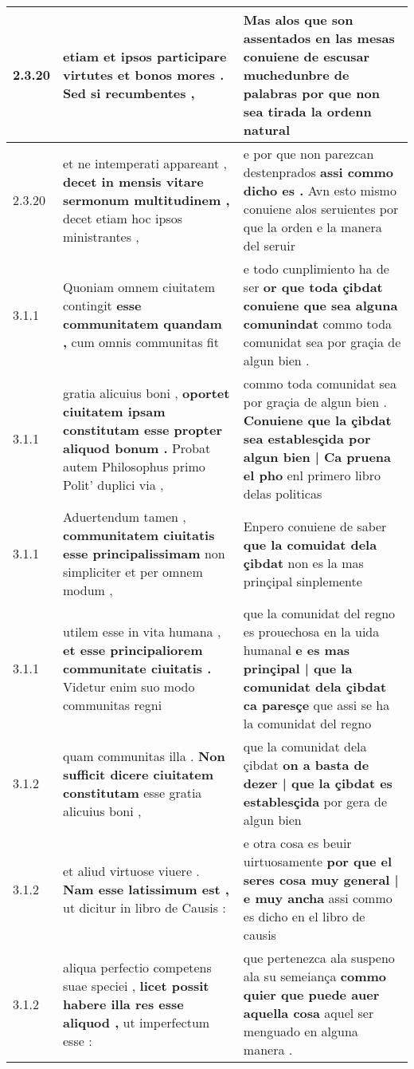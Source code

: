 \begin{tabular}{|p{1cm}|p{6.5cm}|p{6.5cm}|}
2.3.20 & etiam \textbf{ et ipsos participare virtutes et bonos mores . } Sed si recumbentes , & Mas alos que son assentados en las mesas \textbf{ conuiene de escusar muchedunbre de palabras } por que non sea tirada la ordenn natural \\\hline
2.3.20 & et ne intemperati appareant , \textbf{ decet in mensis vitare sermonum multitudinem , } decet etiam hoc ipsos ministrantes , & e por que non parezcan destenprados \textbf{ assi commo dicho es . } Avn esto mismo conuiene alos seruientes por que la orden e la manera del seruir \\\hline
3.1.1 & Quoniam omnem ciuitatem contingit \textbf{ esse communitatem quandam , } cum omnis communitas fit & e todo cunplimiento ha de ser \textbf{ or que toda çibdat conuiene que sea alguna comunindat } commo toda comunidat sea por graçia de algun bien . \\\hline
3.1.1 & gratia alicuius boni , \textbf{ oportet ciuitatem ipsam constitutam esse propter aliquod bonum . } Probat autem Philosophus primo Polit’ duplici via , & commo toda comunidat sea por graçia de algun bien . \textbf{ Conuiene que la çibdat sea establesçida por algun bien | Ca pruena el pho } enl primero libro delas politicas \\\hline
3.1.1 & Aduertendum tamen , \textbf{ communitatem ciuitatis esse principalissimam } non simpliciter et per omnem modum , & Enpero conuiene de saber \textbf{ que la comuidat dela çibdat } non es la mas prinçipal sinplemente \\\hline
3.1.1 & utilem esse in vita humana , \textbf{ et esse principaliorem communitate ciuitatis . } Videtur enim suo modo communitas regni & que la comunidat del regno es prouechosa en la uida humanal \textbf{ e es mas prinçipal | que la comunidat dela çibdat ca paresçe } que assi se ha la comunidat del regno \\\hline
3.1.2 & quam communitas illa . \textbf{ Non sufficit dicere ciuitatem constitutam } esse gratia alicuius boni , & que la comunidat dela çibdat \textbf{ on a basta de dezer | que la çibdat es establesçida } por gera de algun bien \\\hline
3.1.2 & et aliud virtuose viuere . \textbf{ Nam esse latissimum est , } ut dicitur in libro de Causis : & e otra cosa es beuir uirtuosamente \textbf{ por que el seres cosa muy general | e muy ancha } assi commo es dicho en el libro de causis \\\hline
3.1.2 & aliqua perfectio competens suae speciei , \textbf{ licet possit habere illa res esse aliquod , } ut imperfectum esse : & que pertenezca ala suspeno ala su semeiança \textbf{ commo quier que puede auer aquella cosa } aquel ser menguado en alguna manera . \\\hline

\end{tabular}
